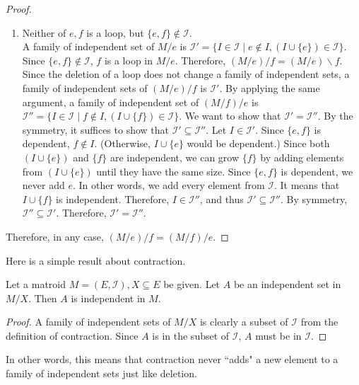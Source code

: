 \begin{proof}
\begin{enumerate}
\item Neither of $e, f$ is a loop, but $\{ e, f \} \notin \mathcal{I}$.\\
A family of independent set of $M / e$ is $\mathcal{I}' = \{ I \in \mathcal{I} \mid e \notin I, (I \cup \{ e \}) \in \mathcal{I} \}$.
Since $\{ e, f \} \notin \mathcal{I}$, $f$ is a loop in $M / e$.
Therefore, $(M / e) / f = (M / e) \backslash f$.
Since the deletion of a loop does not change a family of independent sets, a family of independent sets of $(M / e) / f$ is $\mathcal{I}'$.
By applying the same argument, a family of independent set of $(M / f) / e$ is $\mathcal{I}'' = \{ I \in \mathcal{I} \mid f \notin I, (I \cup \{ f \} ) \in \mathcal{I} \}$.
We want to show that $\mathcal{I}'  = \mathcal{I}''$.
By the symmetry, it suffices to show that $\mathcal{I}' \subseteq \mathcal{I}''$.
Let $I \in \mathcal{I}'$.
Since $\{ e, f \}$ is dependent, $f \notin I$. (Otherwise, $I \cup \{ e \}$ would be dependent.)
Since both $(I \cup \{ e \})$ and $\{ f \}$ are independent, we can grow $\{ f \}$ by adding elements from $(I \cup \{ e \})$ until they have the same size.
Since $\{ e, f\}$ is dependent, we never add $e$.
In other words, we add every element from $\mathcal{I}$.
It means that $I \cup \{ f \}$ is independent.
Therefore, $I \in \mathcal{I}''$, and thus $\mathcal{I}' \subseteq \mathcal{I}''$.
By symmetry, $\mathcal{I}'' \subseteq \mathcal{I}'$.
Therefore, $\mathcal{I}' = \mathcal{I}''$.
\end{enumerate}

Therefore, in any case, $(M / e) / f = (M / f) / e$.
\end{proof}


Here is a simple result about contraction.

\begin{thm}
Let a matroid $M = (E, \mathcal{I}), X \subseteq E$ be given.
Let $A$ be an independent set in $M / X$.
Then $A$ is independent in $M$.
\end{thm}

\begin{proof}
A family of independent sets of $M / X$ is clearly a subset of $\mathcal{I}$ from the definition of contraction.
Since $A$ is in the subset of $\mathcal{I}$, $A$ must be in $\mathcal{I}$.
\end{proof}

In other words, this means that contraction never ``adds" a new element to a family of independent sets just like deletion.


